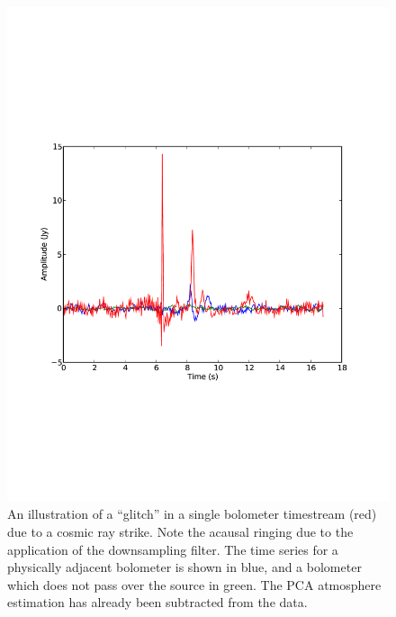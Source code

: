 \documentclass[12pt,preprint]{aastex}
\begin{document}
\begin{figure}
  \begin{minipage}{6.5in}
    \begin{center}
      \includegraphics[scale=0.5]{flagger_plots}
      \caption{An illustration of a ``glitch'' in a single bolometer timestream
      (red) due to a cosmic ray strike.  Note the acausal ringing due to the
      application of the downsampling filter.  The time series for a physically
      adjacent bolometer is shown in blue, and a bolometer which does not pass
      over the source in green.  The PCA atmosphere estimation has already been
      subtracted from the data.}
    \end{center}
  \end{minipage}

\end{figure}


\renewcommand{\thefigure}{\arabic{figure}}
\end{document}
